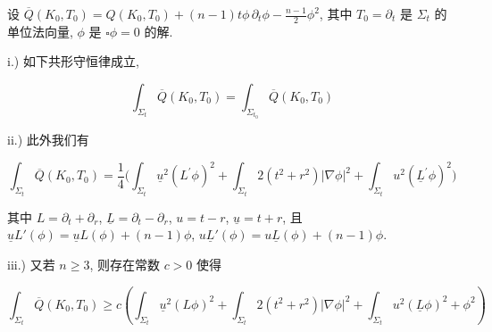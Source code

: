 \begin{proposition}\label{prop:cG-4.11}
设 $\overline{Q}(K_0, T_0) = Q(K_0, T_0) + (n - 1)t\phi\, \partial_t\phi -\frac{n - 1}{2}\phi^2$, 其中 $T_{0} = \partial_{t}$ 是 $\Sigma_t$ 的单位法向量, $\phi$ 是 $\square \phi = 0$ 的解. 

i.) 如下共形守恒律成立, 

\begin{equation}
\int_{\Sigma_{t}} \overline{Q}(K_{0},  T_{0}) = \int_{\Sigma_{t_{0}}} \overline{Q}(K_{0},  T_{0})\label{eq:cG-99}
\end{equation}

ii.) 此外我们有

\begin{equation}
\int_{\Sigma_{t}} \overline{Q}(K_{0},  T_{0}) = \frac{1}{4}\bigg(\int_{\Sigma_{t}} \underline{u}^{2}(L^{\prime}\phi)^{2} + \int_{\Sigma_{t}} 2(t^{2} + r^{2})|\nabla\phi|^{2} + \int_{\Sigma_{t}} u^{2}(\underline{L}^{\prime}\phi)^{2}\bigg)\label{eq:cG-100}
\end{equation}

其中 $L = \partial_t + \partial_r$, $\underline{L} = \partial_t - \partial_r$, $u = t - r$, $\underline{u} = t + r$, 且 $\underline{u}L'(\phi) = \underline{u}L(\phi) + (n - 1)\phi$, $u\underline{L}'(\phi) = u\underline{L}(\phi) + (n - 1)\phi$. 

iii.) 又若 $n \geq 3$, 则存在常数 $c > 0$ 使得

\begin{equation}
\int_{\Sigma_{t}} \overline{Q}(K_{0},  T_{0}) \geq c\left(\int_{\Sigma_{t}} \underline{u}^{2}(L\phi)^{2} + \int_{\Sigma_{t}} 2(t^{2} + r^{2})|\nabla\phi|^{2} + \int_{\Sigma_{t}} u^{2}(\underline{L}\phi)^{2} + \phi^{2}\right)\label{eq:cG-101}
\end{equation}
\end{proposition}

